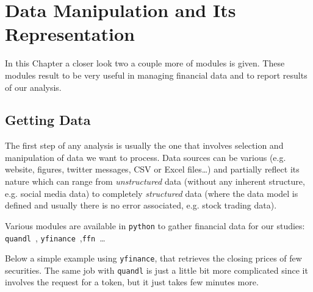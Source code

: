 \chapter{Data Manipulation and Its Representation}
\label{sec:datamanip}

In this Chapter a closer look two a couple more of modules is given. These modules result to be very useful in managing financial data and to report results of our analysis.

\section{Getting Data}\label{getting-data}

The first step of any analysis is usually the one that involves selection and manipulation of data we want to process. Data sources can be various (e.g. website, figures, twitter messages, CSV or Excel files\ldots) and partially reflect its nature which can range from \emph{unstructured} data (without any inherent structure, e.g. social media data) to completely \emph{structured} data (where the data model is defined and usually there is no error associated, e.g. stock trading data).

Various modules are available in \texttt{python} to gather financial data for our studies: \texttt{quandl}~\cite{bib:quandl}, \texttt{yfinance}~\cite{bib:yfinance},\texttt{ffn}~\cite{bib:ffn}\ldots

Below a simple example using \texttt{yfinance}, that retrieves the closing prices of few securities. The same job with \texttt{quandl} is just a little bit more complicated since it involves the request for a token, but it just takes few minutes more.  

